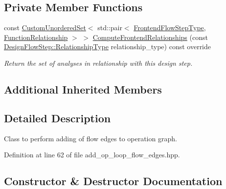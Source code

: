\subsection*{Private Member Functions}
\begin{DoxyCompactItemize}
\item 
const \hyperlink{classCustomUnorderedSet}{Custom\+Unordered\+Set}$<$ std\+::pair$<$ \hyperlink{frontend__flow__step_8hpp_afeb3716c693d2b2e4ed3e6d04c3b63bb}{Frontend\+Flow\+Step\+Type}, \hyperlink{classFrontendFlowStep_af7cf30f2023e5b99e637dc2058289ab0}{Function\+Relationship} $>$ $>$ \hyperlink{classAddOpLoopFlowEdges_a56d18f3ddd600d866b6b79fdb3673adf}{Compute\+Frontend\+Relationships} (const \hyperlink{classDesignFlowStep_a723a3baf19ff2ceb77bc13e099d0b1b7}{Design\+Flow\+Step\+::\+Relationship\+Type} relationship\+\_\+type) const override
\begin{DoxyCompactList}\small\item\em Return the set of analyses in relationship with this design step. \end{DoxyCompactList}\end{DoxyCompactItemize}
\subsection*{Additional Inherited Members}


\subsection{Detailed Description}
Class to perform adding of flow edges to operation graph. 

Definition at line 62 of file add\+\_\+op\+\_\+loop\+\_\+flow\+\_\+edges.\+hpp.



\subsection{Constructor \& Destructor Documentation}
\mbox{\label{classAddOpLoopFlowEdges_ae316795e6d1d8d955bf47ffcb7d622fe}} 
